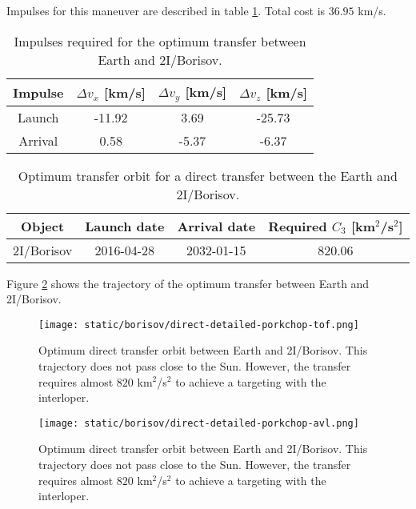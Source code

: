 Impulses for this maneuver are described in table
\ref{tab:borisov-direct-transfer-impulses}. Total cost is $36.95$ km/s.

\begin{table}[H]
  \centering
  \begin{tabular}{|c|c|c|c|}
    \hline
    Impulse & $\Delta v_x$ [km/s] & $\Delta v_y$ [km/s] & $\Delta v_z$ [km/s] \\
    \hline
    Launch & -11.92 & 3.69 & -25.73 \\
    \hline
    Arrival & 0.58 & -5.37 & -6.37 \\
    \hline
  \end{tabular}
  \caption{Impulses required for the optimum transfer between Earth and 2I/Borisov.}
  \label{tab:borisov-direct-transfer-impulses}
\end{table}


\vspace{1cm}
\begin{table}[H]
  \centering
  \begin{tabular}{|c|c|c|c|}
    \hline
    Object & Launch date & Arrival date & Required $C_3$ [km$^2$/s$^2$] \\
    \hline
    2I/Borisov & 2016-04-28 & 2032-01-15 & 820.06 \\
    \hline
  \end{tabular}
  \caption{Optimum transfer orbit for a direct transfer between the Earth and 2I/Borisov.}
  \label{tab:borisov-direct-transfer-optimum}
\end{table}

Figure \ref{fig:borisov-direct-transfer-orbit} shows the trajectory of the
optimum transfer between Earth and 2I/Borisov.

\begin{figure}[H]
  \centering
  \texttt{[image: static/borisov/direct-detailed-porkchop-tof.png]}
  \caption{Optimum direct transfer orbit between Earth and 2I/Borisov. This
        trajectory does not pass close to the Sun. However, the transfer requires almost $820$
        km$^2$/s$^2$ to achieve a targeting with the interloper.}
  \label{fig:borisov-direct-transfer-orbit}
\end{figure}

\begin{figure}[H]
  \centering
  \texttt{[image: static/borisov/direct-detailed-porkchop-avl.png]}
  \caption{Optimum direct transfer orbit between Earth and 2I/Borisov. This
        trajectory does not pass close to the Sun. However, the transfer requires almost $820$
        km$^2$/s$^2$ to achieve a targeting with the interloper.}
  \label{fig:borisov-direct-transfer-orbit}
\end{figure}
